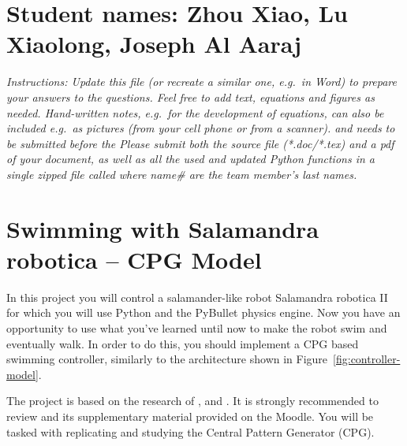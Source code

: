 \documentclass{cmc}
\begin{document}
\pagestyle{fancy}
 

\section*{Student names: Zhou Xiao, Lu Xiaolong, Joseph Al Aaraj}

\textit{Instructions: Update this file (or recreate a similar one, e.g.\ in
  Word) to prepare your answers to the questions. Feel free to add text,
  equations and figures as needed. Hand-written notes, e.g.\ for the development
  of equations, can also be included e.g.\ as pictures (from your cell phone or
  from a scanner).  \textbf{} and needs to be
  submitted before the \textbf{} Please submit both the source file (*.doc/*.tex)
  and a pdf of your document, as well as all the used and updated Python
  functions in a single zipped file called
   where name\# are the team
  member’s last names.  }
\\

\section*{Swimming with Salamandra robotica – CPG Model}
\label{sec:exploring-swimming}

In this project you will control a salamander-like robot Salamandra
robotica II for which you will use Python and the PyBullet physics
engine. Now you have an opportunity to use what you’ve learned until
now to make the robot swim and eventually walk. In order to do this,
you should implement a CPG based swimming controller, similarly to the
architecture shown in Figure~\ref{fig:controller-model}.

The project is based on the research of \cite{Crespi2013},
\cite{Karakasiliotis2013} and \cite{ijspeert2007swimming}. It is strongly
recommended to review \cite{ijspeert2007swimming} and its supplementary material
provided on the Moodle. You will be tasked with replicating and
studying the Central Pattern Generator (CPG).
\end{document}
